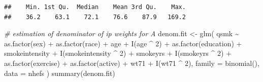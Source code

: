 \documentclass[
  10pt,
]{book}
\newenvironment{Shaded}{\begin{snugshade}}{\end{snugshade}}
\newcommand{\AttributeTok}[1]{\textcolor[rgb]{0.77,0.63,0.00}{#1}}
\newcommand{\CommentTok}[1]{\textcolor[rgb]{0.56,0.35,0.01}{\textit{#1}}}
\newcommand{\DecValTok}[1]{\textcolor[rgb]{0.00,0.00,0.81}{#1}}
\newcommand{\FunctionTok}[1]{\textcolor[rgb]{0.00,0.00,0.00}{#1}}
\newcommand{\NormalTok}[1]{#1}
\newcommand{\OtherTok}[1]{\textcolor[rgb]{0.56,0.35,0.01}{#1}}
\newcommand{\SpecialCharTok}[1]{\textcolor[rgb]{0.00,0.00,0.00}{#1}}
\begin{document}
\begin{verbatim}
##    Min. 1st Qu.  Median    Mean 3rd Qu.    Max. 
##    36.2    63.1    72.1    76.6    87.9   169.2
\end{verbatim}

\begin{Shaded}
\begin{Highlighting}[]
\CommentTok{\# estimation of denominator of ip weights for A}
\NormalTok{denom.fit }\OtherTok{\textless{}{-}}
  \FunctionTok{glm}\NormalTok{(}
\NormalTok{    qsmk }\SpecialCharTok{\textasciitilde{}} \FunctionTok{as.factor}\NormalTok{(sex) }\SpecialCharTok{+} \FunctionTok{as.factor}\NormalTok{(race) }\SpecialCharTok{+}\NormalTok{ age }\SpecialCharTok{+} \FunctionTok{I}\NormalTok{(age }\SpecialCharTok{\^{}} \DecValTok{2}\NormalTok{) }\SpecialCharTok{+}
      \FunctionTok{as.factor}\NormalTok{(education) }\SpecialCharTok{+}\NormalTok{ smokeintensity }\SpecialCharTok{+}
      \FunctionTok{I}\NormalTok{(smokeintensity }\SpecialCharTok{\^{}} \DecValTok{2}\NormalTok{) }\SpecialCharTok{+}\NormalTok{ smokeyrs }\SpecialCharTok{+} \FunctionTok{I}\NormalTok{(smokeyrs }\SpecialCharTok{\^{}} \DecValTok{2}\NormalTok{) }\SpecialCharTok{+}
      \FunctionTok{as.factor}\NormalTok{(exercise) }\SpecialCharTok{+} \FunctionTok{as.factor}\NormalTok{(active) }\SpecialCharTok{+}\NormalTok{ wt71 }\SpecialCharTok{+} \FunctionTok{I}\NormalTok{(wt71 }\SpecialCharTok{\^{}} \DecValTok{2}\NormalTok{),}
    \AttributeTok{family =} \FunctionTok{binomial}\NormalTok{(),}
    \AttributeTok{data =}\NormalTok{ nhefs}
\NormalTok{  )}
\FunctionTok{summary}\NormalTok{(denom.fit)}
\end{Highlighting}
\end{Shaded}
\end{document}
